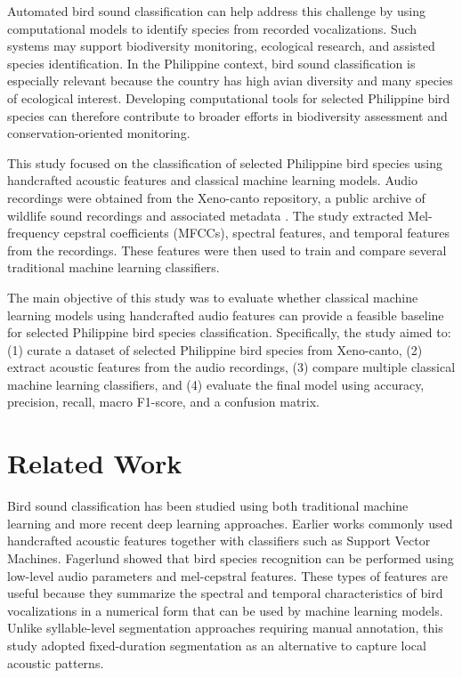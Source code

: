 \documentclass[runningheads]{llncs}
\begin{document}
Automated bird sound classification can help address this challenge by using computational models to identify species from recorded vocalizations. Such systems may support biodiversity monitoring, ecological research, and assisted species identification. In the Philippine context, bird sound classification is especially relevant because the country has high avian diversity and many species of ecological interest. Developing computational tools for selected Philippine bird species can therefore contribute to broader efforts in biodiversity assessment and conservation-oriented monitoring.

This study focused on the classification of selected Philippine bird species using handcrafted acoustic features and classical machine learning models. Audio recordings were obtained from the Xeno-canto repository, a public archive of wildlife sound recordings and associated metadata \cite{xenocanto}. The study extracted Mel-frequency cepstral coefficients (MFCCs), spectral features, and temporal features from the recordings. These features were then used to train and compare several traditional machine learning classifiers.

The main objective of this study was to evaluate whether classical machine learning models using handcrafted audio features can provide a feasible baseline for selected Philippine bird species classification. Specifically, the study aimed to: (1) curate a dataset of selected Philippine bird species from Xeno-canto, (2) extract acoustic features from the audio recordings, (3) compare multiple classical machine learning classifiers, and (4) evaluate the final model using accuracy, precision, recall, macro F1-score, and a confusion matrix.

\section{Related Work}

Bird sound classification has been studied using both traditional machine learning and more recent deep learning approaches. Earlier works commonly used handcrafted acoustic features together with classifiers such as Support Vector Machines. Fagerlund \cite{fagerlund2007} showed that bird species recognition can be performed using low-level audio parameters and mel-cepstral features. These types of features are useful because they summarize the spectral and temporal characteristics of bird vocalizations in a numerical form that can be used by machine learning models. Unlike syllable-level segmentation approaches requiring manual annotation, this study adopted fixed-duration segmentation as an alternative to capture local acoustic patterns.
\end{document}
